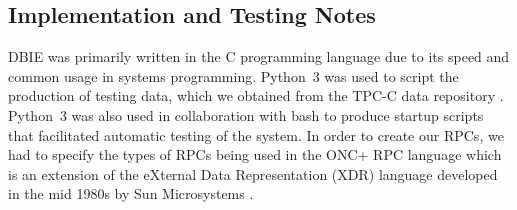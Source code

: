 \subsection{Implementation and Testing Notes}
DBIE was primarily written in the C programming language due to its speed and
common usage in systems programming. Python~3 was used to script the production
of testing data, which we obtained from the TPC-C data repository \cite{tpcc}.
Python~3 was also used in collaboration with bash to produce startup scripts
that facilitated automatic testing of the system. In order to create our RPCs,
we had to specify the types of RPCs being used in the ONC+ RPC language
\cite{stevens1999} which is an extension of the eXternal Data Representation
(XDR) language developed in the mid 1980s by Sun Microsystems \cite{rpcgen}.
